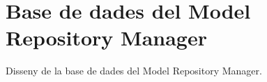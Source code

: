 
\chapter{Base de dades del Model Repository Manager} %

\label{ModelRepositoryDB} %

Disseny de la base de dades del Model Repository Manager.